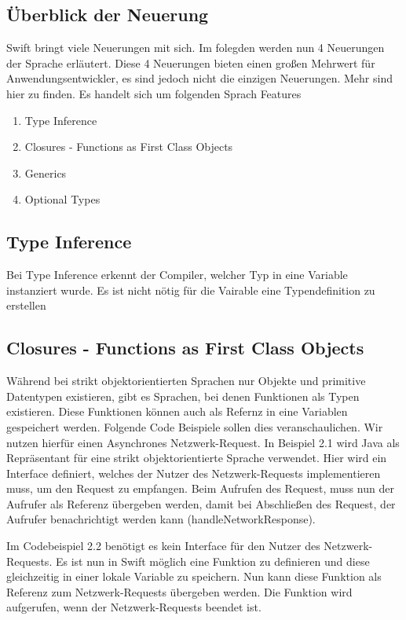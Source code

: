 \subsection{Überblick der Neuerung}
Swift bringt viele Neuerungen mit sich. Im folegden werden nun 4 Neuerungen der Sprache erläutert. Diese 4 Neuerungen bieten einen großen Mehrwert für Anwendungsentwickler, es sind jedoch nicht die einzigen Neuerungen. Mehr sind hier\cite{tre} zu finden. Es handelt sich um folgenden Sprach Features

\begin{enumerate}
\item Type Inference
\item Closures - Functions as First Class Objects
\item Generics
\item Optional Types
\end{enumerate}

\subsection{Type Inference}
Bei Type Inference erkennt der Compiler, welcher Typ in eine Variable instanziert wurde. Es ist nicht nötig für die Vairable eine Typendefinition zu erstellen

\subsection{Closures - Functions as First Class Objects}
Während bei strikt objektorientierten Sprachen nur Objekte und primitive Datentypen existieren, gibt es Sprachen, bei denen Funktionen als Typen existieren. Diese Funktionen können auch als Refernz in eine Variablen gespeichert werden. Folgende Code Beispiele sollen dies veranschaulichen. Wir nutzen hierfür einen Asynchrones Netzwerk-Request. In Beispiel 2.1 wird  Java als Repräsentant für eine strikt objektorientierte Sprache verwendet. Hier wird ein Interface definiert, welches der Nutzer des Netzwerk-Requests implementieren muss, um den Request zu empfangen. Beim Aufrufen des Request, muss nun der Aufrufer als Referenz übergeben werden, damit bei Abschließen des Request, der Aufrufer benachrichtigt werden kann (handleNetworkResponse). 



\lstset{frame=shadowbox}

Im Codebeispiel 2.2 benötigt es kein Interface für den Nutzer des Netzwerk-Requests. Es ist nun in Swift möglich eine Funktion zu definieren und diese gleichzeitig in einer lokale Variable zu speichern. Nun kann diese Funktion als Referenz zum Netzwerk-Requests übergeben werden. Die Funktion wird aufgerufen, wenn der Netzwerk-Requests beendet ist. 

	

